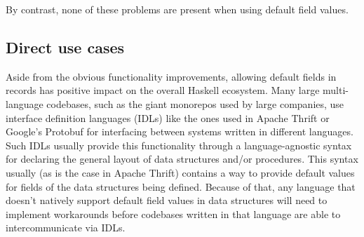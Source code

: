 \documentclass[en]{pracamgr}
\begin{document}
By contrast, none of these problems are present when using default field values.

\subsection{Direct use cases}
Aside from the obvious functionality improvements, allowing default fields in records has positive impact on the overall Haskell ecosystem.
Many large multi-language codebases, such as the giant monorepos used by large companies, use interface definition languages
(IDLs) like the ones used in Apache Thrift or Google's Protobuf for interfacing between systems written in different languages.
Such IDLs usually provide this functionality through a language-agnostic syntax for declaring the general layout of data structures and/or procedures.
This syntax usually (as is the case in Apache Thrift) contains a way to provide default values for fields of the data structures being defined.
Because of that, any language that doesn't natively support default field values in data structures will need to implement workarounds 
before codebases written in that language are able to intercommunicate via IDLs.
\end{document}
